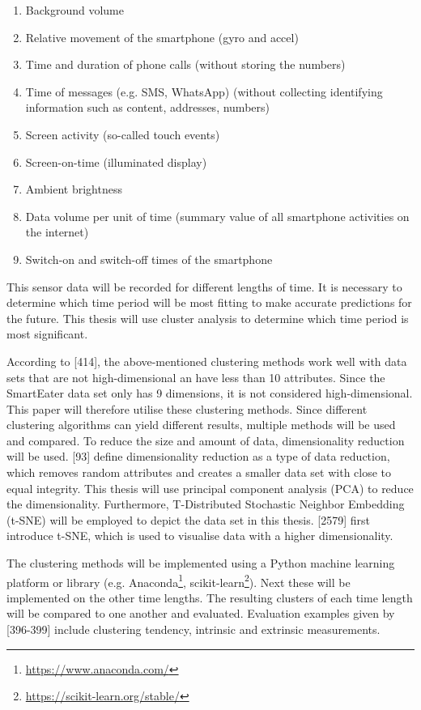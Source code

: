 \documentclass[12pt,a4paper]{article}
\begin{document}
\begin{enumerate}
	\item Background volume
	\item Relative movement of the smartphone (gyro and accel)
	\item Time and duration of phone calls (without storing the numbers)
	\item Time of messages (e.g. SMS, WhatsApp) (without collecting identifying information such as content, addresses, numbers)
	\item Screen activity (so-called touch events)
	\item Screen-on-time (illuminated display)
	\item Ambient brightness
	\item Data volume per unit of time (summary value of all smartphone activities on the internet)
	\item Switch-on and switch-off times of the smartphone
\end{enumerate}



This sensor data will be recorded for different lengths of time. It is necessary to determine which time period will be most fitting to make accurate predictions for the future. This thesis will use cluster analysis to determine which time period is most significant.

According to \textcite{han2011data}[414], the above-mentioned clustering methods work well with data sets that are not high-dimensional an have less than 10 attributes. Since the SmartEater data set only has 9 dimensions, it is not considered high-dimensional. This paper will therefore utilise these clustering methods. Since different clustering algorithms can yield different results, multiple methods will be used and compared.
To reduce the size and amount of data, dimensionality reduction will be used. \textcite{han2011data}[93] define dimensionality reduction as a type of data reduction, which removes random attributes and creates a smaller data set with close to equal integrity. This thesis will use principal component analysis (PCA) to reduce the dimensionality.
Furthermore, T-Distributed Stochastic Neighbor Embedding (t-SNE) will be employed to depict the data set in this thesis. \textcite{maaten2008visualizing}[2579] first introduce t-SNE, which is used to visualise data with a higher dimensionality. 

The clustering methods will be implemented using a Python machine learning platform or library (e.g. Anaconda\footnote{\url{https://www.anaconda.com/}}, scikit-learn\footnote{\url{https://scikit-learn.org/stable/}}). Next these will be implemented on the other time lengths. The resulting clusters of each time length will be compared to one another and evaluated. Evaluation examples given by \textcite{han2011data}[396-399] include clustering tendency, intrinsic and extrinsic measurements. 
\end{document}
